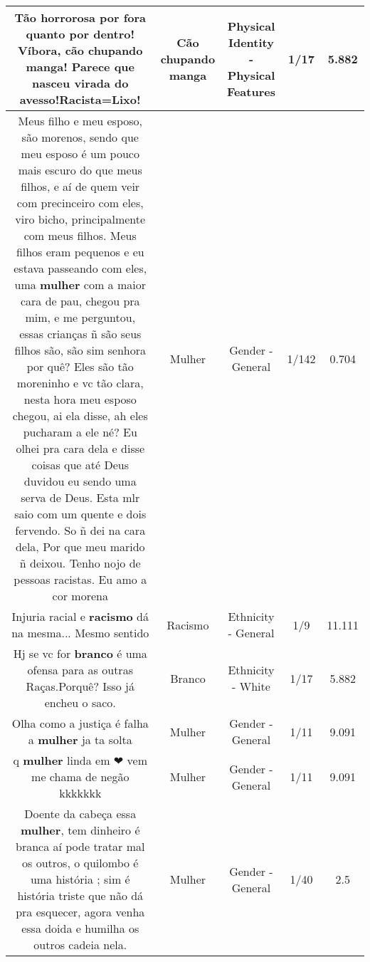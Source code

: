 \documentclass[11pt]{article}
\newlength\mylength
\begin{document}
\begin{center}
\begin{longtable}{|C{.65\mylength}|C{.30\mylength}|C{.12\mylength}|C{.12\mylength}|C{.12\mylength}|}
  \small Tão horrorosa por fora quanto por dentro! Víbora, \textbf{cão chupando manga}! Parece que nasceu virada do avesso!Racista=Lixo!\normalsize   & Cão chupando manga & Physical Identity - Physical Features & 1/17 & 5.882 \\  \hline
  \small Meus filho e meu esposo, são morenos,  sendo que meu esposo é um pouco mais escuro do que meus filhos, e aí de quem veir com precinceiro com eles, viro bicho, principalmente com meus filhos. Meus filhos eram pequenos e eu estava passeando com eles, uma \textbf{mulher} com a maior cara de pau, chegou pra mim, e me perguntou, essas crianças ñ são seus filhos são,  são sim senhora por quê?  Eles são tão moreninho e vc tão clara, nesta hora meu esposo chegou, ai ela disse, ah eles pucharam a ele né?  Eu olhei  pra cara dela e disse coisas que até Deus duvidou eu sendo uma serva de Deus.  Esta mlr saio com um quente e dois fervendo.  So ñ dei na cara dela,  Por que meu marido ñ deixou. Tenho nojo de pessoas racistas. Eu amo a cor morena\normalsize   & Mulher & Gender - General & 1/142 & 0.704 \\  \hline
  \small Injuria racial e \textbf{racismo} dá na mesma... Mesmo sentido\normalsize   & Racismo & Ethnicity - General & 1/9 & 11.111 \\  \hline
  \small Hj se vc for \textbf{branco} é uma ofensa para as outras Raças.Porquê? Isso já encheu o saco.\normalsize   & Branco & Ethnicity - White & 1/17 & 5.882 \\  \hline
  \small Olha como a justiça é falha a \textbf{mulher} ja ta solta\normalsize   & Mulher & Gender - General & 1/11 & 9.091 \\  \hline
  \small q \textbf{mulher} linda em ❤ vem me chama de negão kkkkkkk\normalsize   & Mulher & Gender - General & 1/11 & 9.091 \\  \hline
  \small Doente da cabeça  essa  \textbf{mulher}, tem dinheiro  é branca aí pode tratar mal os outros, o quilombo  é  uma história ; sim é  história  triste  que não  dá  pra esquecer,  agora venha essa doida e humilha  os outros cadeia nela.\normalsize   & Mulher & Gender - General & 1/40 & 2.5 \\  \hline

\end{longtable}
\end{center}
\end{document}
